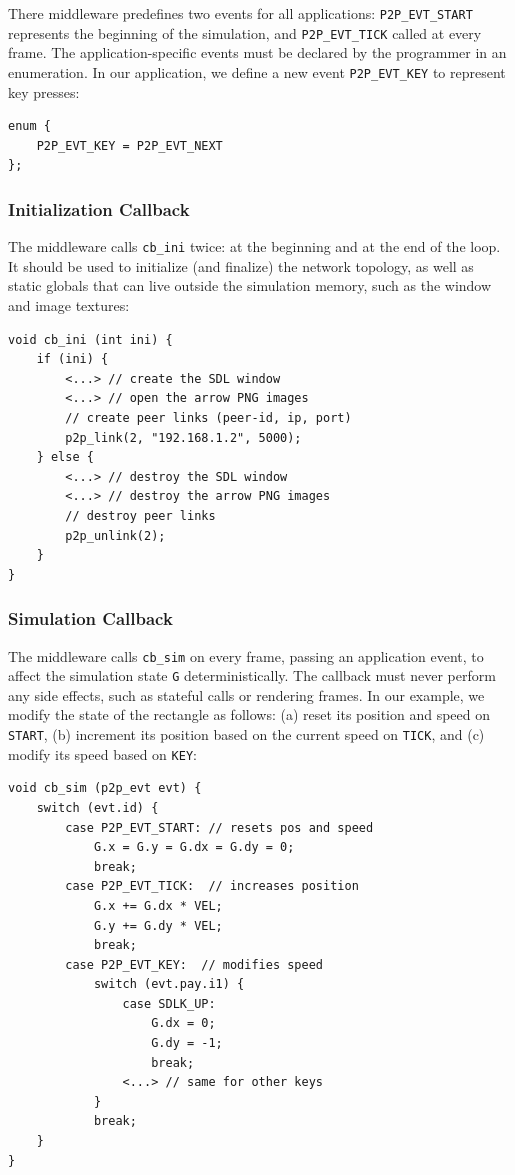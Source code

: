 \documentclass[10pt,journal,compsoc]{IEEEtran}
\newcommand{\code}[1]  {\texttt{\footnotesize{#1}}}
\begin{document}
There middleware predefines two events for all applications:
    \code{P2P\_EVT\_START} represents the beginning of the simulation, and
    \code{P2P\_EVT\_TICK} called at every frame.
The application-specific events must be declared by the programmer in an
enumeration.
In our application, we define a new event \code{P2P\_EVT\_KEY} to represent key
presses:

{\footnotesize
\begin{verbatim}
enum {
    P2P_EVT_KEY = P2P_EVT_NEXT
};
\end{verbatim}
}

\subsubsection{Initialization Callback}
\label{sec.tml.api.cb_ini}

The middleware calls \code{cb\_ini} twice: at the beginning and at the end of
the loop.
It should be used to initialize (and finalize) the network topology, as well
as static globals that can live outside the simulation memory, such as the
window and image textures:

{\footnotesize
\begin{verbatim}
void cb_ini (int ini) {
    if (ini) {
        <...> // create the SDL window
        <...> // open the arrow PNG images
        // create peer links (peer-id, ip, port)
        p2p_link(2, "192.168.1.2", 5000);
    } else {
        <...> // destroy the SDL window
        <...> // destroy the arrow PNG images
        // destroy peer links
        p2p_unlink(2);
    }
}
\end{verbatim}
}

\subsubsection{Simulation Callback}
\label{sec.tml.api.cb_sim}

The middleware calls \code{cb\_sim} on every frame, passing an application
event, to affect the simulation state \code{G} deterministically.
The callback must never perform any side effects, such as stateful calls or
rendering frames.
In our example, we modify the state of the rectangle as follows:
    (a) reset its position and speed on \code{START},
    (b) increment its position based on the current speed on \code{TICK}, and
    (c) modify its speed based on \code{KEY}:

{\footnotesize
\begin{verbatim}
void cb_sim (p2p_evt evt) {
    switch (evt.id) {
        case P2P_EVT_START: // resets pos and speed
            G.x = G.y = G.dx = G.dy = 0;
            break;
        case P2P_EVT_TICK:  // increases position
            G.x += G.dx * VEL;
            G.y += G.dy * VEL;
            break;
        case P2P_EVT_KEY:  // modifies speed
            switch (evt.pay.i1) {
                case SDLK_UP:
                    G.dx = 0;
                    G.dy = -1;
                    break;
                <...> // same for other keys
            }
            break;
    }
}
\end{verbatim}
}
\end{document}

